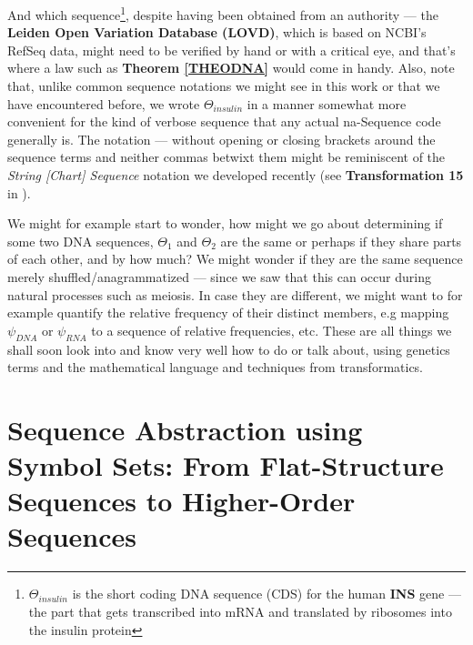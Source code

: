 \documentclass[a4paper, 18pt]{book} %
\begin{document}
And which sequence\footnote{$\Theta_{insulin}$ is the short coding DNA sequence (CDS) for the human \textbf{INS} gene --- the part that gets transcribed into mRNA and translated by ribosomes into the insulin protein\cite{copilot_dna_assistant}}, despite having been obtained from an authority --- the \textbf{Leiden Open Variation Database (LOVD)}, which is based on NCBI's RefSeq data\cite{RefSeq}, might need to be verified by hand or with a critical eye, and that's where a law such as \textbf{Theorem \ref{THEODNA}} would come in handy. Also, note that, unlike common sequence notations we might see in this work or that we have encountered before, we wrote $\Theta_{insulin}$ in a manner somewhat more convenient for the kind of verbose sequence that any actual na-Sequence code generally is. The notation --- without opening or closing brackets around the sequence terms and neither commas betwixt them might be reminiscent of the \textit{String [Chart] Sequence} notation we developed recently (see \textbf{Transformation 15} in \cite{transformatics}).

We might for example start to wonder, how might we go about determining if some two DNA sequences, $\Theta_1$ and $\Theta_2$ are the same or perhaps if they share parts of each other, and by how much? We might wonder if they are the same sequence merely shuffled/anagrammatized --- since we saw that this can occur during natural processes such as meiosis\cite{genomics2025origin}. In case they are different, we might want to for example quantify the relative frequency of their distinct members, e.g mapping $\psi_{DNA}$ or $\psi_{RNA}$ to a sequence of relative frequencies, etc. These are all things we shall soon look into and know very well how to do or talk about, using genetics terms and the mathematical language and techniques from transformatics.

\chapter{Sequence Abstraction using Symbol Sets: From Flat-Structure Sequences to Higher-Order Sequences}
\label{SECSEQAB}
\end{document}
